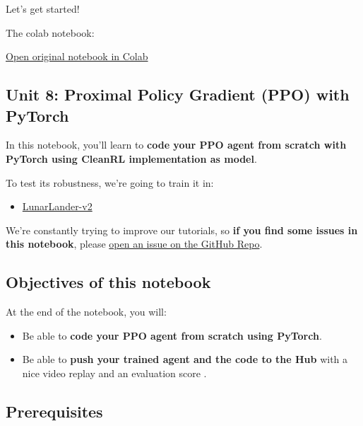 \documentclass[11pt,a4paper]{article}
\begin{document}
Let's get started!

The colab notebook:

\href{https://colab.research.google.com/github/huggingface/deep-rl-class/blob/master/notebooks/unit8/unit8_part1.ipynb}{Open original notebook in Colab}

\subsection{Unit 8: Proximal Policy Gradient (PPO) with PyTorch}\label{unit-8-proximal-policy-gradient-ppo-with-pytorch}


In this notebook, you'll learn to \textbf{code your PPO agent from scratch with PyTorch using CleanRL implementation as model}.

To test its robustness, we're going to train it in:

\begin{itemize}
\tightlist
\item
  \href{https://www.gymlibrary.dev/environments/box2d/lunar_lander/}{LunarLander-v2}
\end{itemize}

We're constantly trying to improve our tutorials, so \textbf{if you find some issues in this notebook}, please \href{https://github.com/huggingface/deep-rl-class/issues}{open an issue on the GitHub Repo}.

\subsection{Objectives of this notebook}\label{objectives-of-this-notebook}

At the end of the notebook, you will:

\begin{itemize}
\tightlist
\item
  Be able to \textbf{code your PPO agent from scratch using PyTorch}.
\item
  Be able to \textbf{push your trained agent and the code to the Hub} with a nice video replay and an evaluation score .
\end{itemize}

\subsection{Prerequisites}\label{prerequisites}
\end{document}
